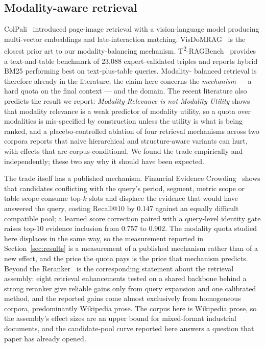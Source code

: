 \documentclass[preprint,3p,times]{elsarticle}
\begin{document}
\subsection{Modality-aware retrieval}

ColPali~\cite{faysse2025colpali} introduced page-image retrieval with a
vision-language model producing multi-vector embeddings and late-interaction
matching. VisDoMRAG~\cite{suri2024visdom} is the closest prior art to our
modality-balancing mechanism. T\textsuperscript{2}-RAGBench~\cite{strich2026t2}
provides a text-and-table benchmark of 23{,}088 expert-validated triples and
reports hybrid BM25 performing best on text-plus-table queries. Modality-
balanced retrieval is therefore already in the literature; the claim here
concerns the \emph{mechanism} --- a hard quota on the final context --- and the
domain. The recent literature also predicts the result we report:
\emph{Modality Relevance is not Modality Utility}
\cite{chen2026modalityutility} shows that modality relevance is a weak predictor
of modality utility, so a quota over modalities is mis-specified by construction
unless the utility is what is being ranked, and a placebo-controlled ablation of
four retrieval mechanisms across two corpora \cite{sharma2026placebo} reports
that naive hierarchical and structure-aware variants can hurt, with effects that
are corpus-conditional. We found the trade empirically and independently; these
two say why it should have been expected.

The trade itself has a published mechanism. Financial Evidence
Crowding~\cite{zhou2026crowding} shows that candidates conflicting with the
query's period, segment, metric scope or table scope consume top-$k$ slots and
displace the evidence that would have answered the query, costing Recall@10 by
0.147 against an equally difficult compatible pool; a learned score correction
paired with a query-level identity gate raises top-10 evidence inclusion from
0.757 to 0.902. The modality quota studied here displaces in the same way, so
the measurement reported in Section~\ref{sec:results} is a measurement of a
published mechanism rather than of a new effect, and the price the quota pays is
the price that mechanism predicts. Beyond the Reranker~\cite{singh2026beyondreranker}
is the corresponding statement about the retrieval assembly: eight retrieval
enhancements tested on a shared backbone behind a strong reranker give
reliable gains only from query expansion and one calibrated method, and the
reported gains come almost exclusively from homogeneous corpora, predominantly
Wikipedia prose. The corpus here is Wikipedia prose, so the assembly's effect
sizes are an upper bound for mixed-format industrial documents, and the
candidate-pool curve reported here answers a question that paper has already
opened.
\end{document}
